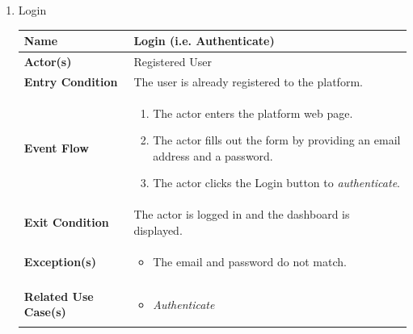 \begin{enumerate}
    \item Login
    \begin{center}
    \begin{tabular}{ | m{10em} | m{10cm}| } 
      \hline
      \textbf{Name} & Login (i.e. Authenticate)  \\ 
      \hline
      \textbf{Actor(s)} & Registered User \\ 
      \hline
      \textbf{Entry Condition} & The user is already registered to the platform. \\ 
      \hline
      \textbf{Event Flow} & 
          \begin{enumerate}[(1)]
              \item The actor enters the platform web page.
              \item The actor fills out the form by providing an email address and a password.
              \item The actor clicks the Login button to \textit{authenticate}.
          \end{enumerate}
      \\ 
      \hline
      \textbf{Exit Condition} & The actor is logged in and the dashboard is displayed.  \\ 
      \hline
      \textbf{Exception(s)} & 
      \begin{itemize}
          \item The email and password do not match.
      \end{itemize}
      \\ 
      \hline
      \textbf{Related Use Case(s)} & 
      \begin{itemize}
          \item \textit{Authenticate}
      \end{itemize}
      \\
      \hline
    \end{tabular}
\end{center}


\end{enumerate}
